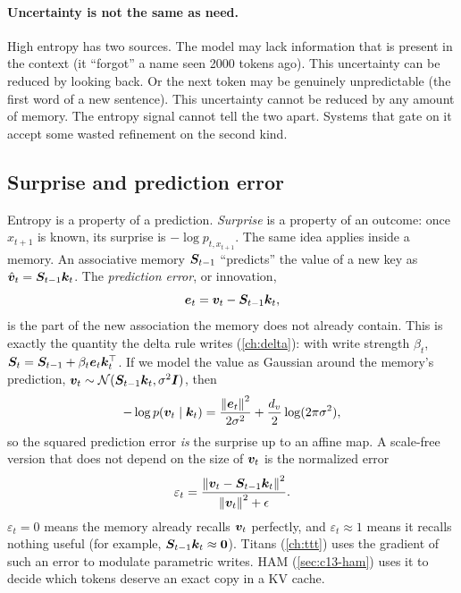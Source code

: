 \paragraph{Uncertainty is not the same as need.} High entropy has two sources. The model may lack
information that is present in the context (it ``forgot'' a name seen 2000 tokens ago). This
uncertainty can be reduced by looking back. Or the next token may be genuinely unpredictable (the
first word of a new sentence). This uncertainty cannot be reduced by any amount of memory. The
entropy signal cannot tell the two apart. Systems that gate on it accept some wasted refinement on the
second kind.

\subsection{Surprise and prediction error}\label{sec:c13-surprise}

Entropy is a property of a prediction. \emph{Surprise} is a property of an outcome: once $x_{t+1}$ is
known, its surprise is $-\log p_{t,x_{t+1}}$. The same idea applies inside a memory. An associative
memory $\bm{S}_{t-1}$ ``predicts'' the value of a new key as $\hat{\bm{v}}_t=\bm{S}_{t-1}\bm{k}_t$. The
\emph{prediction error}, or innovation,
\begin{equation}\label{eq:c13-innovation}
  \bm{e}_t = \bm{v}_t-\bm{S}_{t-1}\bm{k}_t ,
\end{equation}
is the part of the new association the memory does not already contain. This is exactly the quantity
the delta rule writes (\cref{ch:delta}): with write strength $\beta_t$,
$\bm{S}_t=\bm{S}_{t-1}+\beta_t\bm{e}_t\bm{k}_t^{\top}$. If we model the value as Gaussian around the memory's
prediction, $\bm{v}_t\sim\mathcal{N}(\bm{S}_{t-1}\bm{k}_t,\sigma^2\bm{I})$, then
\[
  -\log p(\bm{v}_t\mid\bm{k}_t) = \frac{\left\lVert \bm{e}_t\right\rVert^2}{2\sigma^2} + \frac{d_v}{2}\log(2\pi\sigma^2),
\]
so the squared prediction error \emph{is} the surprise up to an affine map. A scale-free version that
does not depend on the size of $\bm{v}_t$ is the normalized error
\begin{equation}\label{eq:c13-normerr}
  \varepsilon_t = \frac{\left\lVert \bm{v}_t-\bm{S}_{t-1}\bm{k}_t\right\rVert^2}{\left\lVert \bm{v}_t\right\rVert^2+\epsilon}.
\end{equation}
$\varepsilon_t=0$ means the memory already recalls $\bm{v}_t$ perfectly, and $\varepsilon_t\approx 1$ means it
recalls nothing useful (for example, $\bm{S}_{t-1}\bm{k}_t\approx\bm{0}$). Titans (\cref{ch:ttt}) uses the
gradient of such an error to modulate parametric writes. HAM (\cref{sec:c13-ham}) uses it to decide
which tokens deserve an exact copy in a KV cache.


